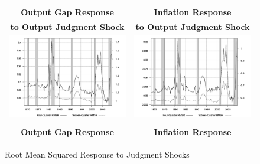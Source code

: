 \documentclass[10pt]{article}
\begin{document}
{\begin{figure}\caption{Root Mean Squared Response to Judgment Shocks}\label{fg:irf_judgment_size}
\hspace*{-2pc}
\begin{tabular}{cc}\\
\textbf{Output Gap Response} & \textbf{Inflation Response} \\
\textbf{to Output Judgment Shock} & \textbf{to Output Judgment Shock}  \\
\includegraphics[scale=0.17]{images/RMS16_Output_Gap_Output_Judgment_Shock.png} & \includegraphics[scale=0.17]{images/RMS16_Inflation_Output_Judgment_Shock.png} \\\\
\textbf{Output Gap Response} & \textbf{Inflation Response} \\ 

\end{tabular}
\end{figure}}
\end{document}
